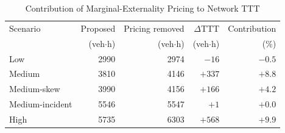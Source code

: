 \begin{table}[t]
\caption{Contribution of Marginal-Externality Pricing to Network TTT}
\label{tab:price_ablation}
\centering
\begin{tabular}{lrrrr}
\toprule
Scenario & Proposed & Pricing removed & $\Delta$TTT & Contribution \\
         & (veh$\cdot$h) & (veh$\cdot$h) & (veh$\cdot$h) & (\%) \\
\midrule
Low            & 2990 & 2974 & $-16$  & $-0.5$ \\
Medium         & 3810 & 4146 & $+337$ & $+8.8$ \\
Medium-skew    & 3990 & 4156 & $+166$ & $+4.2$ \\
Medium-incident& 5546 & 5547 & $+1$   & $+0.0$ \\
High           & 5735 & 6303 & $+568$ & $+9.9$ \\
\bottomrule
\end{tabular}
\end{table}
